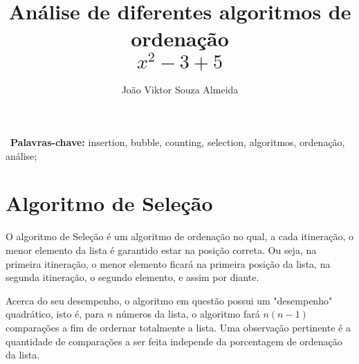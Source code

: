 \documentclass[10pt,a4paper]{article}
\author{João Viktor Souza Almeida}
\title{Análise de diferentes algoritmos de ordenação \[x^2-3+5\]}
\begin{document}
\maketitle
\
\textbf{Palavras-chave:} insertion, bubble, counting, selection, algoritmos, ordenação, análise;

\tableofcontents
\section{Algoritmo de Seleção}
O algoritmo de Seleção é um algoritmo de ordenação no qual, a cada itineração, o menor elemento da lista é garantido estar na posição correta. Ou seja, na primeira itineração, o menor elemento ficará na primeira posição da lista, na segunda itineração, o segundo elemento, e assim por diante. 
\par
Acerca do seu desempenho, o algoritmo em questão possui um "desempenho" quadrático, isto é, para $n$ números da lista, o algoritmo fará $n(n-1)$ comparações a fim de ordernar totalmente a lista. Uma observação pertinente é a quantidade de comparações a ser feita independe da porcentagem de ordenação da lista.
\end{document}
